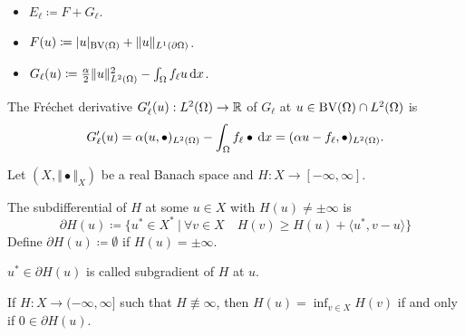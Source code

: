 \begin{frame}
  \begin{itemize}
    \item $E_\ell\coloneqq F+G_\ell$.
    \item $F(u) \coloneqq |u|_{\textup{BV}(\Omega)} + \Vert u
      \Vert_{L^1(\partial\Omega)}$.
    \item $G_\ell(u)\coloneqq \frac{\alpha}{2}\Vert u\Vert_{L^2(\Omega)}^2 -
    \int_\Omega f_\ell u\,\mathrm{d}x$.
  \end{itemize}
  \pause
  The Fr\'echet derivative $G_\ell'(u):L^2(\Omega)\to\mathbb{R}$ of $G_\ell$ at $u\in
  \textup{BV}(\Omega)\cap L^2(\Omega)$ is
  \begin{align*}
    G_\ell'(u) = \alpha (u,\bullet)_{L^2(\Omega)} - \int_\Omega f_\ell
    \bullet\,\mathrm{d}x = (\alpha u-f_\ell ,\bullet)_{L^2(\Omega)}.
  \end{align*}
\end{frame}

\begin{frame}
  
  \pause
  \bigskip

  Let $(X,\Vert\bullet\Vert_X)$ be a real Banach space and 
  $H:X\to [-\infty,\infty]$.
  \medskip
  \pause

  The subdifferential of $H$ at some $u\in X$ with $H(u)\neq\pm\infty$ is
  \begin{equation*}
    \partial H(u)\coloneq 
    \{u^\ast\in X^\ast\ |\ 
    \forall v\in X\quad H(v)\geq H(u)+\langle u^\ast,v-u\rangle\}  
  \end{equation*}
  Define 
  $\partial H(u)\coloneq\emptyset$
  if $H(u)=\pm\infty$.

  \pause
  \medskip
  $u^\ast\in\partial H(u)$ is called subgradient of $H$ at $u$.

  \pause
  \begin{block}{}
    If $H: X\to (-\infty,\infty]$ such that $H\nequiv\infty$, then
    $H(u)=\inf_{v\in X}H(v)$ if and only if $0\in\partial H(u)$.
  \end{block}
\end{frame}

